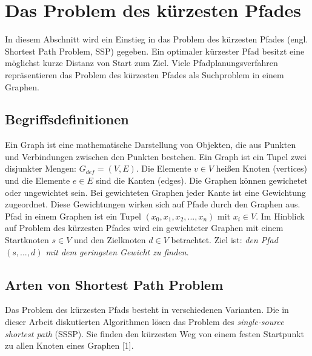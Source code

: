 \chapter{Das Problem des kürzesten Pfades}

In diesem Abschnitt wird ein Einstieg in das Problem des kürzesten Pfades (engl. Shortest Path Problem, SSP) gegeben. Ein optimaler kürzester Pfad besitzt eine möglichst kurze Distanz von Start zum Ziel\cite{Madkour.2017}. Viele Pfadplanungsverfahren repräsentieren das Problem des kürzesten Pfades als Suchproblem in einem Graphen.


\section{Begriffsdefinitionen}

Ein Graph ist eine mathematische Darstellung von Objekten, die aus Punkten und Verbindungen zwischen den Punkten bestehen. Ein Graph ist ein Tupel zwei disjunkter Mengen: $G_{def}= (V,E)$. Die Elemente $v \in V$ heißen Knoten (vertices) und die Elemente $e \in E$ sind die Kanten (edges). Die Graphen können gewichetet oder ungewichtet sein. Bei gewichteten Graphen jeder Kante ist eine Gewichtung zugeordnet. Diese Gewichtungen wirken sich auf Pfade durch den Graphen aus\cite{Gross.2004}. Pfad in einem Graphen ist ein Tupel $\left ( x_{0}, x_{1}, x_{2}, ..., x_{n} \right )$ mit $x_{i} \in V$.  Im Hinblick auf Problem des kürzesten Pfades wird ein gewichteter Graphen mit einem Startknoten $s \in V$ und den Zielknoten $d \in V$ betrachtet. Ziel ist: \textit{den Pfad  $\left ( s, ..., d \right )$ mit dem geringsten Gewicht zu finden}\cite{Madkour.2017}. 



\section{Arten von Shortest Path Problem}

Das Problem des kürzesten Pfads besteht in verschiedenen Varianten. Die in dieser Arbeit diskutierten Algorithmen lösen das Problem des \textit{single-source shortest path} (SSSP). Sie finden den kürzesten Weg von einem festen Startpunkt zu allen Knoten eines Graphen [1]. 

